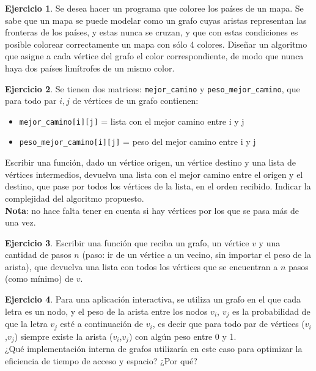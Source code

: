 \documentclass[11pt,a4paper]{article}
\theoremstyle{definition}
\newtheorem{ejercicio}{Ejercicio}[section]
\begin{document}
\begin{ejercicio}
Se desea hacer un programa que coloree los países de un mapa. Se sabe que
un mapa se puede modelar como un grafo cuyas aristas representan las
fronteras de los países, y estas nunca se cruzan, y que con estas
condiciones es posible colorear correctamente un mapa con sólo 4 colores.
Diseñar un algoritmo que asigne a cada vértice del grafo el color
correspondiente, de modo que nunca haya dos países limítrofes de un mismo
color.
\end{ejercicio}

\begin{ejercicio}
Se tienen dos matrices: \lstinline!mejor_camino! y
\lstinline!peso_mejor_camino!, que para todo
par $i,j$ de vértices de un grafo contienen:
\begin{itemize}
\item \lstinline!mejor_camino[i][j]! = lista con el mejor camino entre i y j
\item \lstinline!peso_mejor_camino[i][j]! = peso del mejor camino entre i y j
\end{itemize}
Escribir una función, dado un vértice origen, un vértice destino y una
lista de vértices intermedios, devuelva una lista con el mejor camino entre
el origen y el destino, que pase por todos los vértices de la lista, en el
orden recibido.  Indicar la complejidad del algoritmo propuesto. \\
\textbf{Nota}: no hace falta tener en cuenta si hay vértices por los que se pasa más
de una vez.
\end{ejercicio}

\begin{ejercicio}
Escribir una función que reciba un grafo, un vértice $v$ y una cantidad de
pasos $n$ (paso: ir de un vértice a un vecino, sin importar el peso de la
arista), que devuelva una lista con todos los vértices que se encuentran a
$n$ pasos (como mínimo) de $v$.
\end{ejercicio}

\begin{ejercicio}
Para una aplicación interactiva, se utiliza un grafo en el que cada letra
es un nodo, y el peso de la arista entre los nodos $v_i$, $v_j$ es la
probabilidad de que la letra $v_j$ esté a continuación de $v_i$, es decir
que para todo par de vértices ($v_i$,$v_j$) siempre existe la arista
($v_i$,$v_j$) con algún peso entre 0 y 1. \\
¿Qué implementación interna de grafos utilizaría en este caso para
optimizar la eficiencia de tiempo de acceso y espacio? ¿Por qué?
\end{ejercicio}
\end{document}
